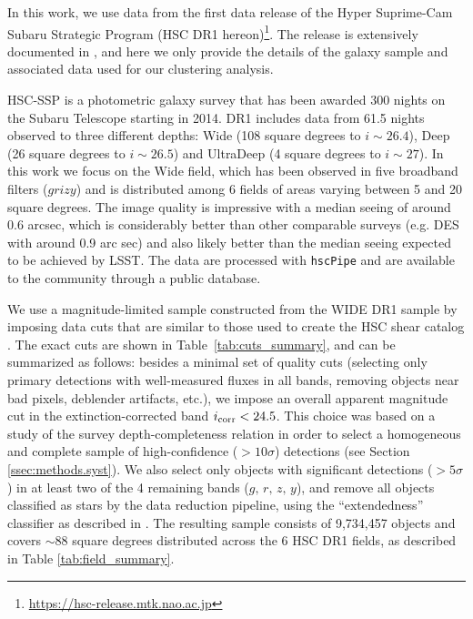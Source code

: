 \documentclass[a4paper,11pt]{article}
\begin{document}
  In this work, we use data from the first data release of the Hyper Suprime-Cam Subaru Strategic Program (HSC DR1 hereon)\footnote{\url{https://hsc-release.mtk.nao.ac.jp}}. The release is extensively documented in \cite{2018PASJ...70S...8A}, and here we only provide the details of the galaxy sample and associated data used for our clustering analysis.

  HSC-SSP is a photometric galaxy survey that has been awarded 300 nights on the Subaru Telescope starting in 2014. DR1 includes data from 61.5 nights observed to three different depths: Wide (108 square degrees to $i\sim 26.4$), Deep (26 square degrees to $i\sim26.5$) and UltraDeep (4 square degrees to $i\sim 27$). In this work we focus on the Wide field, which has been observed in five broadband filters ($grizy$) and is distributed among 6 fields  of areas varying between 5 and 20 square degrees. The image quality is impressive with a median seeing of around 0.6 arcsec, which is considerably better than other comparable surveys (e.g. DES with around 0.9 arc sec) and also likely better than the median seeing expected to be achieved by LSST. The data are processed with \texttt{hscPipe} \cite{2018PASJ...70S...5B} and are available to the community through a public database.
  
  We use a magnitude-limited sample constructed from the WIDE DR1 sample by imposing data cuts that are similar to those used to create the HSC shear catalog \cite{2018PASJ...70S..25M}. The exact cuts are shown in Table~\ref{tab:cuts_summary}, and can be summarized as follows: besides a minimal set of quality cuts (selecting only primary detections with well-measured fluxes in all bands, removing objects near bad pixels, deblender artifacts, etc.), we impose an overall apparent magnitude cut in the extinction-corrected band $i_{\rm corr}<24.5$. This choice was based on a study of the survey depth-completeness relation in order to select a homogeneous and complete sample of high-confidence ($>10\sigma$) detections (see Section \ref{ssec:methods.syst}). We also select only objects with significant detections ($>5\sigma$) in at least two of the 4 remaining bands ($g,\,r,\,z,\,y$), and remove all objects classified as stars by the data reduction pipeline, using the ``extendedness'' classifier as described in \cite{2018PASJ...70S..25M,2018PASJ...70S...5B}. The resulting sample consists of 9,734,457 objects and covers $\sim88$ square degrees distributed across the 6 HSC DR1 fields, as described in Table \ref{tab:field_summary}.
\end{document}
